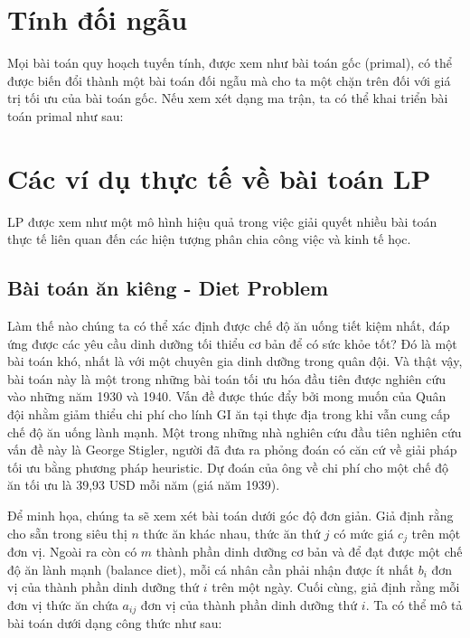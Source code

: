 \section{Tính đối ngẫu}

Mọi bài toán quy hoạch tuyến tính, được xem như bài toán gốc (primal), có thể được biến đổi thành một bài toán đối ngẫu mà cho ta một chặn trên đối với giá trị tối ưu của bài toán gốc. Nếu xem xét dạng ma trận, ta có thể khai triển bài toán primal như sau:





\section{Các ví dụ thực tế về bài toán LP}

LP được xem như một mô hình hiệu quả trong việc giải quyết nhiều bài toán thực tế liên quan đến các hiện tượng phân chia công việc và kinh tế học. 

\subsection{Bài toán ăn kiêng - Diet Problem}

Làm thế nào chúng ta có thể xác định được chế độ ăn uống tiết kiệm nhất, đáp ứng được các yêu cầu dinh dưỡng tối thiểu cơ bản để có sức khỏe tốt? Đó là một bài toán khó, nhất là với một chuyên gia dinh dưỡng trong quân đội. Và thật vậy, bài toán này là một trong những bài toán tối ưu hóa đầu tiên được nghiên cứu vào những năm 1930 và 1940. Vấn đề được thúc đẩy bởi mong muốn của Quân đội nhằm giảm thiểu chi phí cho lính GI ăn tại thực địa trong khi vẫn cung cấp chế độ ăn uống lành mạnh. Một trong những nhà nghiên cứu đầu tiên nghiên cứu vấn đề này là George Stigler, người đã đưa ra phỏng đoán có căn cứ về giải pháp tối ưu bằng phương pháp heuristic. Dự đoán của ông về chi phí cho một chế độ ăn tối ưu là 39,93 USD mỗi năm (giá năm 1939).

Để minh họa, chúng ta sẽ xem xét bài toán dưới góc độ đơn giản. Giả định rằng cho sẵn trong siêu thị $n$ thức ăn khác nhau, thức ăn thứ $j$ có mức giá $c_j$ trên một đơn vị. Ngoài ra còn có $m$ thành phần dinh dưỡng cơ bản và để đạt được một chế độ ăn lành mạnh (balance diet), mỗi cá nhân cần phải nhận được ít nhất $b_i$ đơn vị của thành phần dinh dưỡng thứ $i$ trên một ngày. Cuối cùng, giả định rằng mỗi đơn vị thức ăn chứa $a_{ij}$ đơn vị của thành phần dinh dưỡng thứ $i$. Ta có thể mô tả bài toán dưới dạng công thức như sau:


